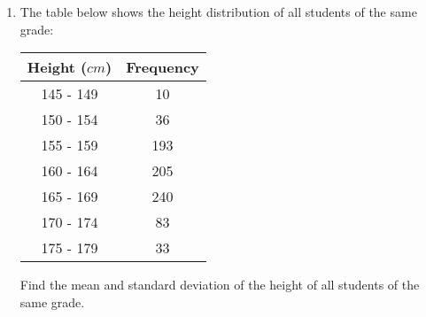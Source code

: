 \documentclass{report}
\begin{document}
\begin{multicols}{2}
\begin{enumerate}
    \item The table below shows the height distribution of all students of the same
          grade:
          \begin{center}
            \begin{tabular}{|c|c|}
              \hline
              Height ($cm$) & Frequency \\
              \hline
              145 - 149     & 10        \\
              150 - 154     & 36        \\
              155 - 159     & 193       \\
              160 - 164     & 205       \\
              165 - 169     & 240       \\
              170 - 174     & 83        \\
              175 - 179     & 33        \\
              \hline
            \end{tabular}
          \end{center}
          Find the mean and standard deviation of the height of all students of the same grade.
          \sol{}
          \begin{center}
\end{center}
\end{enumerate}
\end{multicols}
\end{document}
